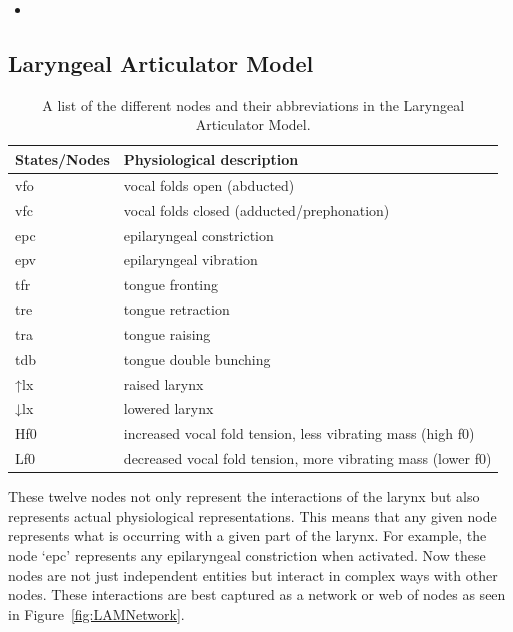 \documentclass[12pt, letterpaper]{article}
\providecommand{\lsptoprule}{\midrule\toprule}
\providecommand{\lspbottomrule}{\bottomrule\midrule}
\begin{document}
\begin{itemize}
    \item \citet{silvermanLaryngealComplexityOtomanguean1997,blankenshipTimeCourseBreathiness1997,blankenshipTimingNonmodalPhonation2002}
\end{itemize}

\subsection{Laryngeal Articulator Model} \label{sec:LAM}

\begin{table}[!ht]
	\centering
	\caption{A list of the different nodes and their abbreviations in the Laryngeal Articulator Model.}
	\label{tab:States}
	 \begin{tabular}{ll}
	  \lsptoprule
	  States/Nodes	&	 Physiological description \\
	  \hline
	  	vfo   	&  vocal folds open (abducted) \\
		vfc    	&  vocal folds closed (adducted/prephonation)\\
		epc   	&  epilaryngeal constriction\\
		epv			&  epilaryngeal vibration \\
		tfr 		&  tongue fronting \\
		tre 		&  tongue retraction \\
		tra 		&  tongue raising \\
		tdb 		&	 tongue double bunching\\
		↑lx     &  raised larynx\\
		↓lx			&  lowered larynx\\
		Hf0			&  increased vocal fold tension, less vibrating mass (high f0)\\
		Lf0			&  decreased vocal fold tension, more vibrating mass (lower f0)\\
	  \lspbottomrule
	 \end{tabular}
\end{table}

These twelve nodes not only represent the interactions of the larynx but also represents actual physiological representations. This means that any given node represents what is occurring with a given part of the larynx. For example, the node `epc'  represents any epilaryngeal constriction when activated. Now these nodes are not just independent entities but interact in complex ways with other nodes. These interactions are best captured as a network or web of nodes as seen in Figure~\ref{fig:LAMNetwork}. 
\end{document}
